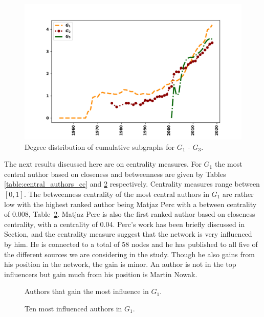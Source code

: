 \documentclass{article}
\theoremstyle{definition}
\begin{document}
\begin{figure}[!hbtp]
    \centering
    \includegraphics[width=.7\textwidth]{./assets/images/degrees_over_time.pdf}
    \caption{Degree distribution of cumulative subgraphs for \(G_1\) - \(G_3\).}\label{fig:degree_distr_cumu}
\end{figure}

\begin{table}[!hbtp]
    \centering
    \begin{adjustbox}{totalheight=\baselineskip}
    }
    \caption{Collaborativeness metrics for cumulative graphs.}\label{table:coll_cumulative}
\end{adjustbox}
\end{table}

The next results discussed here are on centrality measures. For \(G_1\)
the most central author based on closeness and betweenness are given by Tables
\ref{table:central_authors_cc} and \ref{table:central_authors} respectively.
Centrality measures range between \([0, 1]\). The betweenness centrality of the
most central authors in \(G_1\) are rather low with the highest ranked author
being Matjaz Perc with a between centrality of 0.008, Table~\ref{table:central_authors}.
Matjaz Perc is also the first ranked author based on closeness centrality, with
a centrality of 0.04. Perc's work has been briefly discussed in Section, and the
centrality measure suggest that the network is very influenced by him. He is
connected to a total of 58 nodes and he has published to all five of the different
sources we are considering in the study. Though he also gains from his position
in the network, the gain is minor. An author is not in the top influencers but
gain much from his position is Martin Nowak.

\begin{figure}[!hbtp]
    \begin{minipage}{.45\textwidth}
        \centering
        
        \caption{Authors that gain the most influence in \(G_1\).}\label{table:central_authors_cc}
    \end{minipage}%
    \begin{minipage}{.45\textwidth}
        \centering
        
        \caption{Ten most influenced authors in \(G_1\).}\label{table:central_authors}
    \end{minipage}
\end{figure}
\end{document}
